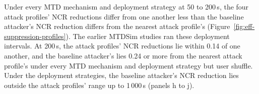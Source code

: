 \documentclass{cshonours}
\newcommand{\prelim}[1]{#1}
\begin{document}
Under every MTD mechanism and deployment strategy at 50 to 200\,s, the
four attack profiles' NCR reductions differ from one another less than the
baseline attacker's NCR reduction differs from the nearest attack profile's
(Figure~\ref{fig:eff-suppression-profiles}). The earlier MTDSim studies ran
these deployment intervals. At 200\,s, the attack profiles' NCR
reductions lie within \prelim{0.14} of one another, and the baseline attacker's
lies \prelim{0.24} or more from the nearest attack profile's under every MTD
mechanism and deployment strategy but user shuffle.
Under the
deployment strategies, the baseline attacker's NCR reduction lies outside the
attack profiles' range up to \prelim{1\,000}\,s (panels h to j).
\end{document}
